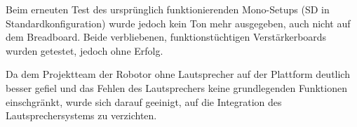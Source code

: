 Beim erneuten Test des ursprünglich funktionierenden Mono-Setups (SD in Standardkonfiguration) wurde jedoch kein Ton mehr ausgegeben, auch nicht auf dem Breadboard. 
Beide verbliebenen, funktionstüchtigen Verstärkerboards wurden getestet, jedoch ohne Erfolg.

Da dem Projektteam der Robotor ohne Lautsprecher auf der Plattform deutlich besser gefiel und das Fehlen des Lautsprechers keine grundlegenden Funktionen einschgränkt, wurde sich darauf geeinigt, auf die Integration des Lautsprechersystems zu verzichten. 

